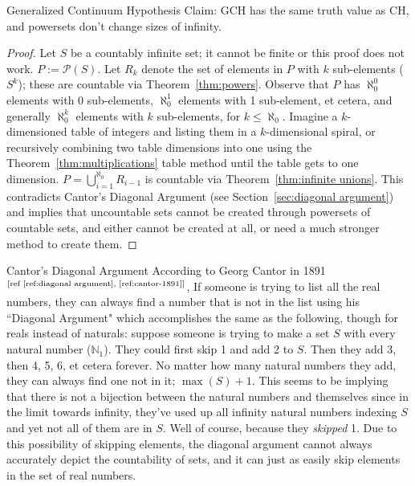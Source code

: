 \documentclass[12pt]{article}
\begin{document}
\begin{section}{Generalized Continuum Hypothesis}\label{sec:GCH}
	Claim: GCH has the same truth value as CH, and powersets don't change sizes of infinity.
	\begin{proof}
		Let $S$ be a countably infinite set; it cannot be finite or this proof does not work.
		$P :=\mathcal P(S)$. Let $R_k$ denote the set of elements in $P$ with $k$ sub-elements
		($S^k$); these are countable via Theorem~\ref{thm:powers}. Observe that $P$ has
		$\aleph_0^0$ elements with 0 sub-elements, $\aleph_0^1$ elements with 1 sub-element, et
		cetera, and generally $\aleph_0^k$ elements with $k$ sub-elements, for
		$k\leqslant \aleph_0$. Imagine a $k$-dimensioned table of integers and listing them in
		a $k$-dimensional spiral, or recursively combining two table dimensions into one using
		the Theorem~\ref{thm:multiplications} table method until the table gets to one dimension.
		$\displaystyle P=\bigcup_{i=1}^{\aleph_0}R_{i-1}$ is countable via
		Theorem~\ref{thm:infinite unions}. This contradicts Cantor's Diagonal Argument (see
		Section~\ref{sec:diagonal argument}) and implies that uncountable sets cannot be created
		through powersets of countable sets, and either cannot be created at all, or need a much
		stronger method to create them.
	\end{proof}
\end{section}

\begin{section}{Cantor's Diagonal Argument}\label{sec:diagonal argument}
	According to Georg Cantor in 1891$^\text{[ref \ref{ref:diagonal argument}, \ref{ref:cantor-1891}]}$,
	If someone is trying to list all the real numbers, they can always find a number that is not in the
	list using his ``Diagonal Argument" which accomplishes the same as the following, though for reals
	instead of naturals: suppose someone is trying to make a set $S$ with every natural number
	($\mathbb N_1$). They could first skip 1 and add 2 to $S$. Then they add 3, then 4, 5, 6, et cetera
	forever. No matter how many natural numbers they add, they can always find one not in it;
	$\max(S)+1$. This seems to be implying that there is not a bijection between the natural numbers and
	themselves since in the limit towards infinity, they've used up all infinity natural numbers
	indexing $S$ and yet not all of them are in $S$. Well of course, because they \emph{skipped} 1. Due
	to this possibility of skipping elements, the diagonal argument cannot always accurately depict the
	countability of sets, and it can just as easily skip elements in the set of real numbers.
\end{section}
\end{document}
